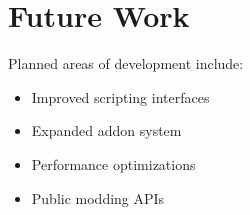 \section{Future Work}

Planned areas of development include:
\begin{itemize}
	\item Improved scripting interfaces
	\item Expanded addon system
	\item Performance optimizations
	\item Public modding APIs
\end{itemize}
